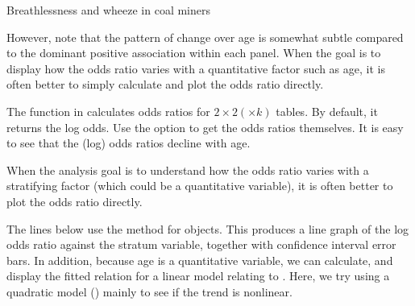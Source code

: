 \documentclass[11pt]{book}
\renewenvironment{knitrout}{\small\renewcommand{\baselinestretch}{.85}}{} %
\begin{document}
\begin{Example}[wheeze1]{Breathlessness and wheeze in coal miners}
\begin{knitrout}
\color{fgcolor}\begin{kframe}
\begin{alltt}
  \hlstd{=} \hlstd{(}\hlstd{,}\hlstd{))}
\end{alltt}


{\ttfamily\noindent\bfseries\color{errorcolor}{\#\# Error: object 'CM' not found}}\end{kframe}
\end{knitrout}

However, note that the pattern of change over age is somewhat subtle
compared to the dominant positive association within each
panel.
When the goal is to display how the odds ratio varies with
a quantitative factor such as age, it is often better to simply
calculate and plot the odds ratio directly.

The  function in  calculates odds ratios
for $2 \times 2 (\times k)$ tables.  By default, it returns the
log odds.  Use the option  to get the odds ratios
themselves.  It is easy to see that the (log) odds ratios decline
with age.
\begin{knitrout}
\color{fgcolor}\begin{kframe}
\begin{alltt}
\end{alltt}


{\ttfamily\noindent\bfseries\color{errorcolor}{\#\# Error: object 'CM' not found}}\begin{alltt}
 \hlstd{=}\hlstd{)}
\end{alltt}


{\ttfamily\noindent\bfseries\color{errorcolor}{\#\# Error: object 'CM' not found}}\end{kframe}
\end{knitrout}
When the analysis goal is to understand how the odds ratio varies
with a stratifying factor (which could be a quantitative variable),
it is often better to plot the odds ratio directly. 

The lines below
use the  method for  objects.
This produces a line graph of the log odds ratio against the 
stratum variable, together with confidence interval error bars.
In addition, because age is a quantitative variable, we can
calculate, and display the fitted relation for a linear model
relating  to .  Here, we try using a
quadratic model () mainly to see if the
trend is nonlinear.
\begin{knitrout}
\color{fgcolor}\begin{kframe}
\begin{alltt}
 \hlkwb{<-} 
\end{alltt}



\end{kframe}
\end{knitrout}
\end{Example}
\end{document}
